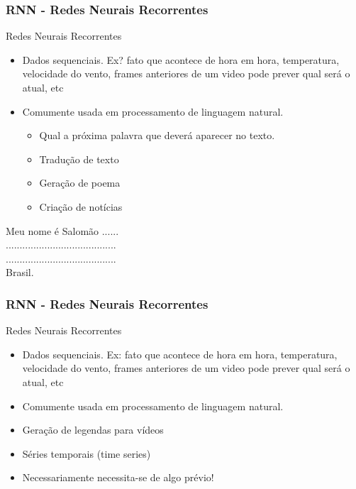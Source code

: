 \documentclass{beamer}
\begin{document}
\begin{frame}
	\frametitle{RNN - Redes Neurais Recorrentes}
	\begin{block}{Redes Neurais Recorrentes}
		\begin{itemize}
			\item Dados sequenciais. Ex? fato que acontece de hora em hora, temperatura, velocidade do vento, frames anteriores de um video pode prever qual será o atual, etc
			\item Comumente usada em processamento de linguagem natural.
			\begin{itemize}
				\item Qual a próxima palavra que deverá aparecer no texto.
				\item Tradução de texto
				\item Geração de poema
				\item Criação de notícias
			\end{itemize}
		\end{itemize}
		
		\begin{example}
			Meu nome é Salomão ......\\........................................\\........................................\\ Brasil.
		\end{example}
		
	\end{block}
\end{frame}
\begin{frame}
	\frametitle{RNN - Redes Neurais Recorrentes}
	\begin{block}{Redes Neurais Recorrentes}
		\begin{itemize}
			\item Dados sequenciais. Ex: fato que acontece de hora em hora, temperatura, velocidade do vento, frames anteriores de um video pode prever qual será o atual, etc
			\item Comumente usada em processamento de linguagem natural.
			\item Geração de legendas para vídeos
			\item Séries temporais (time series)
			\item Necessariamente necessita-se de algo prévio!
		\end{itemize}

	\end{block}
\end{frame}
\end{document}
